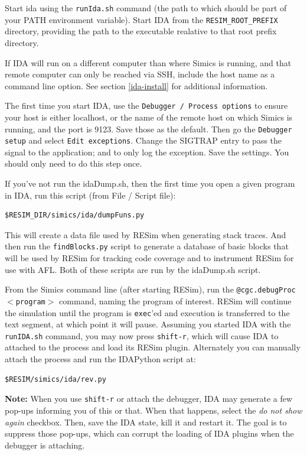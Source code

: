 \documentclass[titlepage]{article}
\begin{document}
Start ida using the {\tt runIda.sh} command (the path to which should be part of your PATH environment variable).  Start IDA from the
{\tt RESIM\_ROOT\_PREFIX} directory, providing the path to the executable realative to that root prefix directory.

If IDA will run on a different computer than where Simics is running, and that remote computer can only be reached via SSH, include the host 
name as a command line option.  See section \ref{ida-install} for additional information.

The first time you start IDA, use the {\tt Debugger / Process options} to ensure your host is either localhost, or the name of the remote host
on which Simics is running, and the port is 9123.  Save those as 
the default.  Then go the {\tt Debugger setup} and select {\tt Edit exceptions}.  Change the SIGTRAP entry to pass the signal to the application;
and to only log the exception.  Save the settings.  You should only need to do this step once.

If you've not run the idaDump.sh, then the first time you open a given program in IDA, run this script (from File / Script file):
\begin{verbatim}
$RESIM_DIR/simics/ida/dumpFuns.py 
\end{verbatim}
\noindent This will create a data file used by RESim when generating stack traces.
And then run the {\tt findBlocks.py} script to generate a database of basic blocks that will be used by RESim for tracking code
coverage and to instrument RESim for use with AFL.  Both of these scripts are run by the idaDump.sh script.

From the Simics command line (after starting RESim), run the {\tt @cgc.debugProc$<$program$>$} command, naming the program of interest.
RESim will continue the simulation until the program is {\tt exec}'ed and execution is transferred to the text segment, at which point it will pause.
Assuming you started IDA with the {\tt runIDA.sh} command, you may now press {\tt shift-r}, which will cause IDA to attached to the
process and load its RESim plugin.  Alternately you can manually attach the process and run the IDAPython script at:
\begin{verbatim}
$RESIM/simics/ida/rev.py
\end{verbatim}

\noindent \textbf{Note:} When you use {\tt shift-r} or attach the debugger, IDA may generate a few pop-ups informing you of this or that.  When that happens, select the 
\textit{do not show again} checkbox.  Then, save the IDA state, kill it and restart it.  The goal is to suppress those pop-ups, which can corrupt the
loading of IDA plugins when the debugger is attaching.
\end{document}
